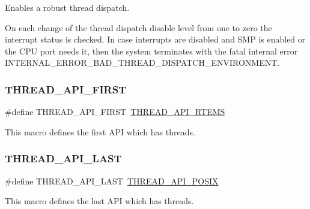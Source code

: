 Enables a robust thread dispatch. 

On each change of the thread dispatch disable level from one to zero the interrupt status is checked. In case interrupts are disabled and S\+MP is enabled or the C\+PU port needs it, then the system terminates with the fatal internal error I\+N\+T\+E\+R\+N\+A\+L\+\_\+\+E\+R\+R\+O\+R\+\_\+\+B\+A\+D\+\_\+\+T\+H\+R\+E\+A\+D\+\_\+\+D\+I\+S\+P\+A\+T\+C\+H\+\_\+\+E\+N\+V\+I\+R\+O\+N\+M\+E\+NT. \mbox{\label{group__RTEMSScoreThread_gaa8beca1577c24c8107f1d30a0b5c1c4c}} 
\subsubsection{\texorpdfstring{THREAD\_API\_FIRST}{THREAD\_API\_FIRST}}
{\footnotesize\ttfamily \#define T\+H\+R\+E\+A\+D\+\_\+\+A\+P\+I\+\_\+\+F\+I\+R\+ST~\mbox{\hyperlink{group__RTEMSScoreThread_ggaf87b9c0fbba9460ccb284584454c5280abe3da3f1c02de606c8ff1488564a0a73}{T\+H\+R\+E\+A\+D\+\_\+\+A\+P\+I\+\_\+\+R\+T\+E\+MS}}}

This macro defines the first A\+PI which has threads. \mbox{\label{group__RTEMSScoreThread_gae9eede8eaa139d657213be4d38a5f756}} 
\subsubsection{\texorpdfstring{THREAD\_API\_LAST}{THREAD\_API\_LAST}}
{\footnotesize\ttfamily \#define T\+H\+R\+E\+A\+D\+\_\+\+A\+P\+I\+\_\+\+L\+A\+ST~\mbox{\hyperlink{group__RTEMSScoreThread_ggaf87b9c0fbba9460ccb284584454c5280a643780b2fad6bb2de6b6688b2f2423cc}{T\+H\+R\+E\+A\+D\+\_\+\+A\+P\+I\+\_\+\+P\+O\+S\+IX}}}

This macro defines the last A\+PI which has threads. \mbox{\label{group__RTEMSScoreThread_ga68e095a67ea3f48b97721e9c2be35a8a}} 
